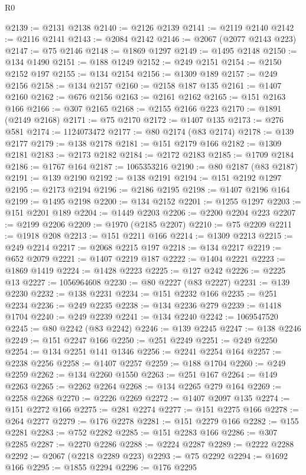 \begin{lexlean}{R0}
\begin{coremodule}
@2139 := @2131 @2138
@2140 := @2126 @2139
@2141 := @2119 @2140
@2142 := @2116 @2141
@2143 := @2084 @2142
@2146 := @2067 (@2077 @2143 @223)
@2147 := @75 @2146
@2148 := @1869 @1297
@2149 := @1495 @2148
@2150 := @134 @1490
@2151 := @188 @1249
@2152 := @249 @2151
@2154 := @2150 @2152 @197
@2155 := @134 @2154
@2156 := @1309 @189
@2157 := @249 @2156
@2158 := @134 @2157
@2160 := @2158 @187 @135
@2161 := @1407 @2160
@2162 := @676 @2156
@2163 := @2161 @2162
@2165 := @151 @2163 @166
@2166 := @307 @2165
@2168 := @2155 @2166 @223
@2170 := @1891 (@2149 @2168)
@2171 := @75 @2170
@2172 := @1407 @135
@2173 := @276 @581
@2174 := 1124073472
@2177 := @80 @2174 (@83 @2174)
@2178 := @139 @2177
@2179 := @138 @2178
@2181 := @151 @2179 @166
@2182 := @1309 @2181
@2183 := @2173 @2182
@2184 := @2172 @2183
@2185 := @1709 @2184
@2186 := @1767 @164
@2187 := 1065353216
@2190 := @80 @2187 (@83 @2187)
@2191 := @139 @2190
@2192 := @138 @2191
@2194 := @151 @2192 @1297
@2195 := @2173 @2194
@2196 := @2186 @2195
@2198 := @1407 @2196 @164
@2199 := @1495 @2198
@2200 := @134 @2152
@2201 := @1255 @1297
@2203 := @151 @2201 @189
@2204 := @1449 @2203
@2206 := @2200 @2204 @223
@2207 := @2199 @2206
@2209 := @1970 (@2185 @2207)
@2210 := @75 @2209
@2211 := @1918 @208
@2213 := @151 @2211 @166
@2214 := @1309 @2213
@2215 := @249 @2214
@2217 := @2068 @2215 @197
@2218 := @134 @2217
@2219 := @652 @2079
@2221 := @1407 @2219 @187
@2222 := @1404 @2221
@2223 := @1869 @1419
@2224 := @1428 @2223
@2225 := @127 @242
@2226 := @2225 @13
@2227 := 1056964608
@2230 := @80 @2227 (@83 @2227)
@2231 := @139 @2230
@2232 := @138 @2231
@2234 := @151 @2232 @166
@2235 := @251 @2234
@2236 := @249 @2235
@2238 := @134 @2236 @279
@2239 := @1418 @1704
@2240 := @249 @2239
@2241 := @134 @2240
@2242 := 1069547520
@2245 := @80 @2242 (@83 @2242)
@2246 := @139 @2245
@2247 := @138 @2246
@2249 := @151 @2247 @166
@2250 := @251 @2249
@2251 := @249 @2250
@2254 := @134 @2251 @141 @1346
@2256 := @2241 @2254 @164
@2257 := @2238 @2256
@2258 := @1407 @2257
@2259 := @188 @1704
@2260 := @249 @2259
@2262 := @134 @2260 @1550
@2263 := @251 @167
@2264 := @149 @2263
@2265 := @2262 @2264
@2268 := @134 @2265 @279 @164
@2269 := @2258 @2268
@2270 := @2226 @2269
@2272 := @1407 @2097 @135
@2274 := @151 @2272 @166
@2275 := @281 @2274
@2277 := @151 @2275 @166
@2278 := @264 @2277
@2279 := @176 @2278
@2281 := @151 @2279 @166
@2282 := @155 @2281
@2283 := @752 @2282
@2285 := @151 @2283 @166
@2286 := @307 @2285
@2287 := @2270 @2286
@2288 := @2224 @2287
@2289 := @2222 @2288
@2292 := @2067 (@2218 @2289 @223)
@2293 := @75 @2292
@2294 := @1692 @166
@2295 := @1855 @2294
@2296 := @176 @2295

\end{coremodule}
\end{lexlean}
